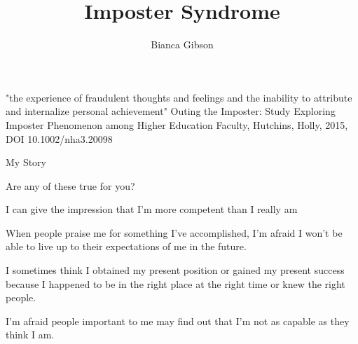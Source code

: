 \documentclass[aspectratio=169]{beamer}
\title{Imposter Syndrome}
\author{Bianca Gibson}
\institute{Pycon AU 2016}
\date{}
\begin{document}
\frame{\titlepage}

\begin{frame}
  \begin{center}
    \Huge "the experience of fraudulent thoughts and feelings and the inability to attribute and internalize personal achievement"
    \small Outing the Imposter: Study Exploring Imposter Phenomenon among Higher Education Faculty, Hutchins, Holly, 2015, DOI 10.1002/nha3.20098
  \end{center}
\end{frame}

\begin{frame}
  \begin{center}
    \Huge My Story
  \end{center}
\end{frame}

\begin{frame}
  \begin{center}
    \Huge Are any of these true for you?
  \end{center}
\end{frame}

\begin{frame}
  \begin{center}
    \Huge  I can give the impression that I’m more competent than I really am
  \end{center}
\end{frame}

\begin{frame}
  \begin{center}
    \Huge  When  people  praise  me  for  something  I’ve  accomplished,  I’m  afraid  I  won’t  be able to live up to their expectations of me in the future.
  \end{center}
\end{frame}

\begin{frame}
  \begin{center}
    \Huge  I sometimes think I obtained my present position or gained my present success because I happened to be in the right
    place at the right time or knew the right people.
  \end{center}
\end{frame}

\begin{frame}
  \begin{center}
    \Huge  I’m  afraid  people  important  to  me  may  find  out  that  I’m  not  as  capable  as  they  think  I  am.
  \end{center}
\end{frame}
\end{document}
